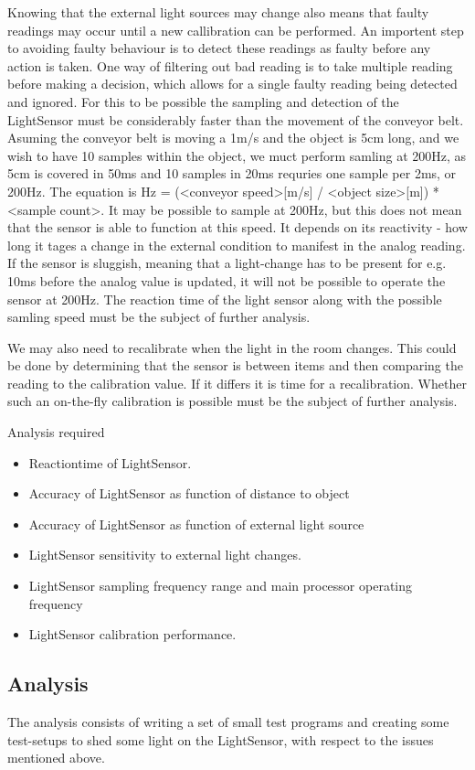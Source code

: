 Knowing that the external light sources may change also means that faulty readings may occur until a new callibration can be performed. An importent step to avoiding faulty behaviour is to detect these readings as faulty before any action is taken. One way of filtering out bad reading is to take multiple reading before making a decision, which allows for a single faulty reading being detected and ignored. For this to be possible the sampling and detection of the LightSensor must be considerably faster than the movement of the conveyor belt. Asuming the conveyor belt is moving a 1m/s and the object is 5cm long, and we wish to have 10 samples within the object, we muct perform samling at 200Hz, as 5cm is covered in 50ms and 10 samples in 20ms requries one sample per 2ms, or 200Hz. The equation is Hz = (<conveyor speed>[m/s] / <object size>[m]) * <sample count>. It may be possible to sample at 200Hz, but this does not mean that the sensor is able to function at this speed. It depends on its reactivity - how long it tages a change in the external condition to manifest in the analog reading. If the sensor is sluggish, meaning that a light-change has to be present for e.g. 10ms before the analog value is updated, it will not be possible to operate the sensor at 200Hz. The reaction time of the light sensor along with the possible samling speed must be the subject of further analysis.

We may also need to recalibrate when the light in the room changes. This could be done by determining that the sensor is between items and then comparing the reading to the calibration value. If it differs it is time for a recalibration. Whether such an on-the-fly calibration is possible must be the subject of further analysis.

\noindent Analysis required
\begin{itemize}
    \item Reactiontime of LightSensor.
    \item Accuracy of LightSensor as function of distance to object
    \item Accuracy of LightSensor as function of external light source
    \item LightSensor sensitivity to external light changes.
    \item LightSensor sampling frequency range and main processor operating frequency
    \item LightSensor calibration performance.
\end{itemize}

\subsection{Analysis}
The analysis consists of writing a set of small test programs and creating some test-setups to shed some light on the LightSensor, with respect to the issues mentioned above. 

